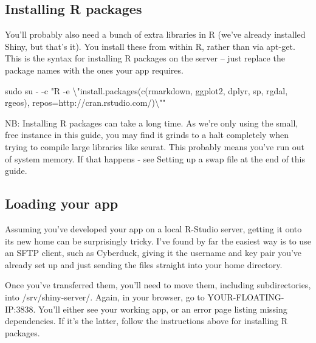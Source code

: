 \documentclass[
]{book}
\newenvironment{Shaded}{\begin{snugshade}}{\end{snugshade}}
\newcommand{\AttributeTok}[1]{\textcolor[rgb]{0.77,0.63,0.00}{#1}}
\newcommand{\DataTypeTok}[1]{\textcolor[rgb]{0.13,0.29,0.53}{#1}}
\newcommand{\FunctionTok}[1]{\textcolor[rgb]{0.00,0.00,0.00}{#1}}
\newcommand{\NormalTok}[1]{#1}
\newcommand{\StringTok}[1]{\textcolor[rgb]{0.31,0.60,0.02}{#1}}
\begin{document}
\hypertarget{installing-r-packages}{%
\subsection{Installing R packages}\label{installing-r-packages}}

You'll probably also need a bunch of extra libraries in R (we've already installed Shiny, but that's it). You install these from within R, rather than via apt-get. This is the syntax for installing R packages on the server -- just replace the package names with the ones your app requires.

\begin{Shaded}
\begin{Highlighting}[]

\FunctionTok{sudo}\NormalTok{ su }\AttributeTok{{-}} \AttributeTok{{-}c} \StringTok{"R {-}e }\DataTypeTok{\textbackslash{}"}\StringTok{install.packages(c(\textquotesingle{}rmarkdown\textquotesingle{}, \textquotesingle{}ggplot2\textquotesingle{}, \textquotesingle{}dplyr\textquotesingle{}, \textquotesingle{}sp\textquotesingle{}, \textquotesingle{}rgdal\textquotesingle{}, \textquotesingle{}rgeos\textquotesingle{}), repos=\textquotesingle{}http://cran.rstudio.com/\textquotesingle{})}\DataTypeTok{\textbackslash{}"}\StringTok{"}
\end{Highlighting}
\end{Shaded}

NB: Installing R packages can take a long time. As we're only using the small, free instance in this guide, you may find it grinds to a halt completely when trying to compile large libraries like seurat. This probably means you've run out of system memory. If that happens - see Setting up a swap file at the end of this guide.

\hypertarget{loading-your-app}{%
\subsection{Loading your app}\label{loading-your-app}}

Assuming you've developed your app on a local R-Studio server, getting it onto its new home can be surprisingly tricky. I've found by far the easiest way is to use an SFTP client, such as Cyberduck, giving it the username and key pair you've already set up and just sending the files straight into your home directory.

Once you've transferred them, you'll need to move them, including subdirectories, into /srv/shiny-server/.
Again, in your browser, go to YOUR-FLOATING-IP:3838. You'll either see your working app, or an error page listing missing dependencies. If it's the latter, follow the instructions above for installing R packages.
\end{document}
